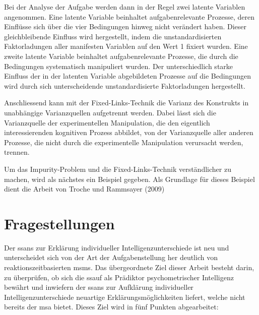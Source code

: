\documentclass[11pt, twoside, a4paper]{book}		%
\begin{document}

Bei der Analyse der Aufgabe werden dann in der Regel zwei latente Variablen angenommen. Eine latente Variable beinhaltet aufgabenrelevante Prozesse, deren Einflüsse sich über die vier Bedingungen hinweg nicht verändert haben. Dieser gleichbleibende Einfluss wird hergestellt, indem die unstandardisierten Faktorladungen aller manifesten Variablen auf den Wert 1 fixiert wurden. Eine zweite latente Variable beinhaltet aufgabenrelevante Prozesse, die durch die Bedingungen systematisch manipuliert wurden. Der unterschiedlich starke Einfluss der in der latenten Variable abgebildeten Prozesse auf die Bedingungen wird durch sich unterscheidende unstandardisierte Faktorladungen hergestellt.

Anschliessend kann mit der Fixed-Links-Technik die Varianz des Konstrukts in unabhängige Varianzquellen aufgetrennt werden. Dabei lässt sich die Varianzquelle der experimentellen Manipulation, die den eigentlich interessierenden kognitiven Prozess abbildet, von der Varianzquelle aller anderen Prozesse, die nicht durch die experimentelle Manipulation verursacht werden, trennen.

Um das Impurity-Problem und die Fixed-Links-Technik verständlicher zu machen, wird als nächstes ein Beispiel gegeben. Als Grundlage für dieses Beispiel dient die Arbeit von Troche und Rammsayer (2009)

\section{Fragestellungen \label{sec:Fragestellungen}}

Der \gls{ssans} zur Erklärung individueller Intelligenzunterschiede ist neu und unterscheidet sich von der Art der Aufgabenstellung her deutlich von reaktionszeitbasierten \glspl{msm}. Das übergeordnete Ziel dieser Arbeit besteht darin, zu überprüfen, ob sich die \gls{ssauf} als Prädiktor psychometrischer Intelligenz bewährt und inwiefern der \gls{ssans} zur Aufklärung individueller Intelligenzunterschiede neuartige Erklärungsmöglichkeiten liefert, welche nicht bereits der \gls{msa} bietet. Dieses Ziel wird in fünf Punkten abgearbeitet:
\end{document}
